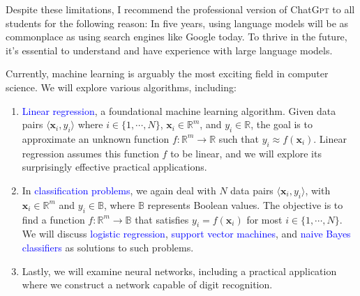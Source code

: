 \begin{enumerate}
      Despite these limitations, I recommend the professional version of Chat\textsc{Gpt} to all students for
      the following reason: In five years, using language models will be as commonplace as using search engines
      like Google today. To thrive in the future, it's essential to understand and have experience with large
      language models. 

      Currently, machine learning is arguably the most exciting field in computer science. We will explore
      various algorithms, including: 
      \begin{enumerate}
      \item \textcolor{blue}{Linear regression}, a foundational machine learning algorithm. Given data pairs
             $\langle \mathbf{x}_i, y_i \rangle$ where $i \in \{1,\cdots,N\}$, $\mathbf{x}_i \in \mathbb{R}^m$, and
             $y_i \in \mathbb{R}$, the goal is to approximate an unknown function
             $f:\mathbb{R}^m \rightarrow
             \mathbb{R}$ such that $y_i \approx f(\mathbf{x}_i)$. Linear regression assumes this function $f$
             to be linear, and we will explore its surprisingly effective practical applications. 
       \item In \textcolor{blue}{classification problems}, we again deal with $N$ data pairs
             $\langle \mathbf{x}_i, y_i \rangle$, with $\mathbf{x}_i \in \mathbb{R}^m$ and $y_i \in \mathbb{B}$, where
             $\mathbb{B}$ represents Boolean values. The objective is to find a function
             $f:\mathbb{R}^m \rightarrow \mathbb{B}$ that satisfies $y_i = f(\mathbf{x}_i)$ for most $i\in\{1,\cdots,N\}$. We will
             discuss \textcolor{blue}{logistic regression}, \textcolor{blue}{support vector machines}, and
             \textcolor{blue}{naive Bayes classifiers} as solutions to such problems. 
       \item Lastly, we will examine neural networks, including a practical application where we construct a
             network capable of digit recognition. 
       \end{enumerate}
\end{enumerate}

